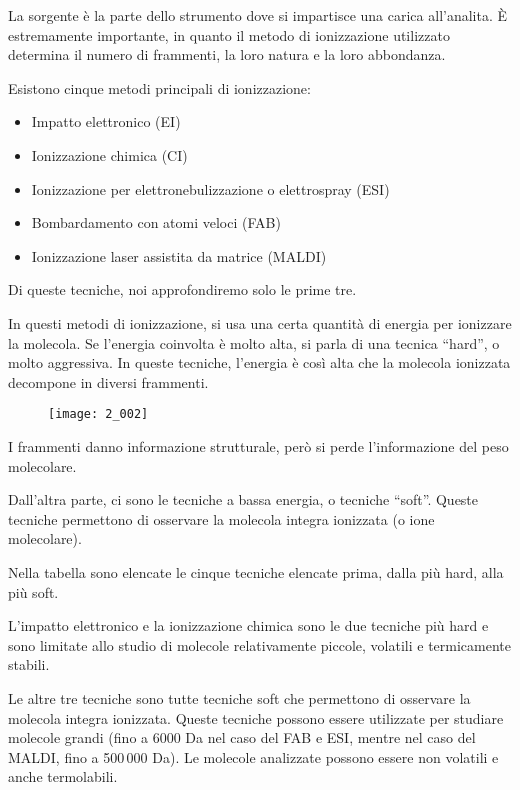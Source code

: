 La sorgente è la parte dello strumento dove si impartisce una carica
all'analita. È estremamente importante, in quanto il metodo di
ionizzazione utilizzato determina il numero di frammenti, la loro natura
e la loro abbondanza.

Esistono cinque metodi principali di ionizzazione: 
\begin{itemize}
  \item Impatto elettronico (EI)
  \item Ionizzazione chimica (CI)
  \item Ionizzazione per elettronebulizzazione o elettrospray (ESI)
  \item Bombardamento con atomi veloci (FAB)
  \item Ionizzazione laser assistita da matrice (MALDI)
\end{itemize}

Di queste tecniche, noi approfondiremo solo le prime tre.

In questi metodi di ionizzazione, si usa una certa quantità di energia
per ionizzare la molecola. Se l'energia coinvolta è molto alta, si parla
di una tecnica ``hard'', o molto aggressiva. In queste tecniche,
l'energia è così alta che la molecola ionizzata decompone in diversi
frammenti.

\begin{figure}[H]
  \texttt{[image: 2\_002]}
\end{figure}

I frammenti danno informazione strutturale, però si perde l'informazione
del peso molecolare.

Dall'altra parte, ci sono le tecniche a bassa energia, o tecniche
``soft''. Queste tecniche permettono di osservare la molecola integra
ionizzata (o ione molecolare).

Nella tabella sono elencate le cinque tecniche elencate prima, dalla più
hard, alla più soft.

L'impatto elettronico e la ionizzazione chimica sono le due tecniche più
hard e sono limitate allo studio di molecole relativamente piccole,
volatili e termicamente stabili.

Le altre tre tecniche sono tutte tecniche soft che permettono di
osservare la molecola integra ionizzata. Queste tecniche possono essere
utilizzate per studiare molecole grandi (fino a 6000 Da nel caso del FAB
e ESI, mentre nel caso del MALDI, fino a 500\,000 Da). Le molecole
analizzate possono essere non volatili e anche termolabili.

